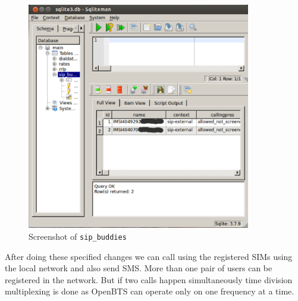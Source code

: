 \begin{figure}
  \centering
    \includegraphics[width=0.87\textwidth]{../images/sipbuddies}
  \caption[Screenshot - sip\_buddies]{Screenshot of \texttt{sip\_buddies}}
  \label{sipbuddies}
\end{figure}

After doing these specified changes we can call using the registered SIMs
using the local network and also send SMS. More than one pair of users can be
registered in the network. But if two calls happen simultaneously time
division multiplexing is done as OpenBTS can operate only on one frequency
at a time. 

